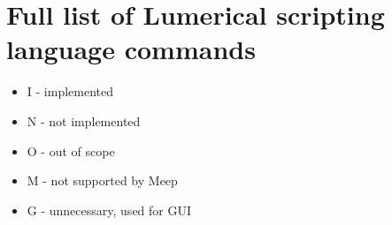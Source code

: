 
\chapter{Full list of Lumerical scripting language commands} \label{appendix:one}
\begin{itemize}
\item I - implemented
\item N - not implemented
\item O - out of scope
\item M - not supported by Meep
\item G - unnecessary, used for GUI
\end{itemize}

